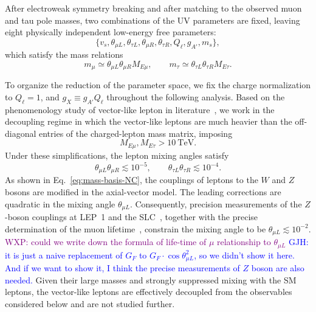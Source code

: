\documentclass[onecolumn, aps, nofootinbib, prd, preprint, floats, floatfix, amsmath, amssymb, superscriptaddress, preprintnumbers]{revtex4-2}
\newcommand{\GJH}[1]{\textcolor{blue} {GJH: #1}}
\newcommand{\WXP}[1]{\textcolor{purple} {WXP: #1}}
\begin{document}
After electroweak symmetry breaking and after matching to the observed muon and tau pole masses, two combinations of the UV parameters are fixed, leaving eight physically independent low-energy free parameters:
\begin{equation}
    \{v_s, \theta_{\mu L}, \theta_{\tau L}, \theta_{\mu R},\theta_{\tau R}, Q_\ell, g_{A'}, m_s \},
    \end{equation}
which satisfy the mass relations
\begin{equation}
    m_\mu\simeq \theta_{\mu L} \theta_{\mu R} M_{E\mu}, \qquad
    m_\tau\simeq \theta_{\tau L} \theta_{\tau R} M_{E\tau}.
    \end{equation}

To organize the reduction of the parameter space, we fix the charge normalization to $Q_\ell=1$, and $g_X\equiv g_{A'} Q_\ell$ throughout the following analysis. Based on the phenomenology study of vector-like lepton in literature~\cite{Cao:2023smj,Yue:2026tbc,Yue:2025xvk,Yue:2024sds}, we work in the decoupling regime in which the vector-like leptons are much heavier than the off-diagonal entries of the charged-lepton mass matrix, imposing
\begin{equation}
M_{E\mu},M_{E\tau}>10~\mathrm{TeV}.
\end{equation}
Under these simplifications, the lepton mixing angles satisfy
\begin{equation}
    \theta_{\mu L}\theta_{\mu R}\lesssim 10^{-5}, \qquad
    \theta_{\tau L}\theta_{\tau R}\lesssim 10^{-4}.
    \end{equation}
As shown in Eq.~\eqref{eq:mass-basis-NC}, the couplings of leptons to the $W$ and $Z$ bosons are modified in the axial-vector model. The leading corrections are quadratic in the mixing angle $\theta_{\mu L}$. Consequently, precision measurements of the $Z$-boson couplings at LEP~1 and the SLC~\cite{ALEPH:2005ab}, together with the precise determination of the muon lifetime~\cite{ParticleDataGroup:2024cfk}, constrain the mixing angle to be $\theta_{\mu L} \lesssim 10^{-2}$. \WXP{could we write down the formula of life-time of $\mu$ relationship to $\theta_{\mu L}$} \GJH{it is just a naive replacement of $G_F$ to $G_F\cdot \cos\theta_{\mu L}^2$, so we didn't show it here. And if we want to show it, I think the precise measurements of $Z$ boson are also needed.} Given their large masses and strongly suppressed mixing with the SM leptons, the vector-like leptons are effectively decoupled from the observables considered below and are not studied further.
\end{document}
